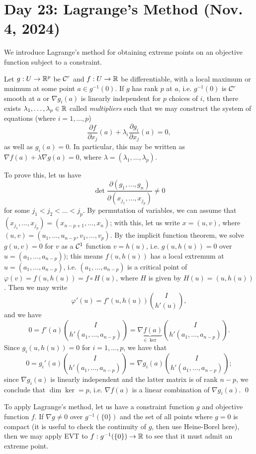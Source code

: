 \section{Day 23: Lagrange's Method (Nov. 4, 2024)}
We introduce Lagrange's method for obtaining extreme points on an objective function subject to a constraint.
\begin{simplethm}
    Let $g : U \to \mathbb R^p$ be $\mathcal C^r$ and $f : U \to \mathbb R$ be differentiable, with a local maximum or mnimum at some point $a \in g^{-1}(0)$. If $g$ has rank $p$ at $a$, i.e. $g^{-1}(0)$ is $\mathcal C^r$ smooth at $a$ or $\nabla g_i(a)$ is linearly independent for $p$ choices of $i$, then there exists $\lambda_1, \dots, \lambda_p \in \mathbb R$ called \textit{multipliers} such that we may construct the system of equations (where $i = 1, \dots, p$)
    \[ \frac{\partial f}{\partial x_j} (a) + \lambda_i \frac{\partial g_i}{\partial x_j} (a) = 0, \]
    as well as $g_i(a) = 0$. In particular, this may be written as $\nabla f(a) + \lambda \nabla g(a) = 0$, where $\lambda = (\lambda_1, \dots, \lambda_p)$.
\end{simplethm}
\noindent To prove this, let us have
\[ \det \frac{\partial(g_1, \dots, g_n)}{\partial(x_{j_1}, \dots, x_{j_p})} \neq 0 \]
for some $j_1 < j_2 < \dots < j_p$. By permutation of variables, we can assume that $(x_{j_1}, \dots, x_{j_p}) = (x_{n-p+1}, \dots, x_n)$; with this, let us write $x = (u, v)$, where $(u, v) = (u_1, \dots, u_{n-p}, v_1, \dots, v_p)$. By the implicit function theorem, we solve $g(u, v) = 0$ for $v$ as a $\mathcal C^1$ function $v = h(u)$, i.e. $g(u, h(u)) = 0$ over $u = (a_1, \dots, a_{n-p}))$; this means $f(u, h(u))$ has a local extremum at $u = (a_1, \dots, a_{n-p})$, i.e. $(a_1, \dots, a_{n-p})$ is a critical point of $\varphi(v) = f(u, h(u)) = f \circ H(u)$, where $H$ is given by $H(u) = (u, h(u))$. Then we may write
\[ \varphi'(u) = f'(u, h(u)) \binom{I}{h'(u)}, \]
and we have
\[ 0 = f'(a) \binom{I}{h'(a_1, \dots, a_{n-p})} = \underbrace{\nabla f(a)}_{\in \ker} \binom{I}{h'(a_1, \dots, a_{n-p})}. \]
Since $g_i(u, h(u)) = 0$ for $i = 1, \dots, p$, we have that
\[ 0 = g_i'(a) \binom{I}{h'(a_1, \dots, a_{n-p})} = \nabla g_i(a) \binom{I}{h'(a_1, \dots, a_{n-p})}; \]
since $\nabla g_i(a)$ is linearly independent and the latter matrix is of rank $n - p$, we conclude that $\dim \ker = p$, i.e. $\nabla f(a)$ is a linear combination of $\nabla g_i(a)$. \qed
\begin{remark}
    To apply Lagrange's method, let us have a constraint function $g$ and objective function $f$. If $\nabla g \neq 0$ over $g^{-1}(\{0\})$ and the set of all points where $g = 0$ is compact (it is useful to check the continuity of $g$, then use Heine-Borel here), then we may apply EVT to $f : g^{-1}(\{0\}) \to \mathbb R$ to see that it must admit an extreme point.
\end{remark}

